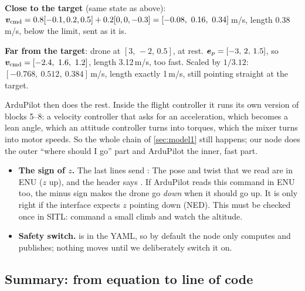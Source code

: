 \begin{toy}
\textbf{Close to the target} (same state as above): $\vv_{\text{cmd}}=0.8[-0.1,0.2,0.5]+0.2[0,0,-0.3]=[-0.08,\ 0.16,\ 0.34]$\,m/s,
length 0.38\,m/s, below the limit, sent as it is.

\textbf{Far from the target}: drone at $[3,\,-2,\,0.5]$, at rest. $\bm{e}_p=[-3,\,2,\,1.5]$, so
$\bm{v}_{\text{cmd}}=[-2.4,\ 1.6,\ 1.2]$, length 3.12\,m/s, too fast. Scaled by $1/3.12$: $[-0.768,\ 0.512,\ 0.384]$\,m/s,
length exactly 1\,m/s, still pointing straight at the target.
\end{toy}

ArduPilot then does the rest. Inside the flight controller it runs its own version of blocks 5--8: a velocity controller
that asks for an acceleration, which becomes a lean angle, which an attitude controller turns into torques, which the
mixer turns into motor speeds. So the whole chain of \cref{sec:model1} still happens; our node does the outer
``where should I go'' part and ArduPilot the inner, fast part.

\begin{warn}
\begin{itemize}
  \item \textbf{The sign of $z$.} The last lines send :
        The pose and twist that we read are in ENU ($z$ up), and the header says . If ArduPilot reads this
        command in ENU too, the minus sign makes the drone go \emph{down} when it should go up. It is only right if the
        interface expects $z$ pointing down (NED). This must be checked once in SITL: command a small climb and watch
        the altitude.
  \item \textbf{Safety switch.}  is  in the YAML, so by default the node only computes and
        publishes; nothing moves until we deliberately switch it on.
\end{itemize}
\end{warn}

\subsection{Summary: from equation to line of code}

